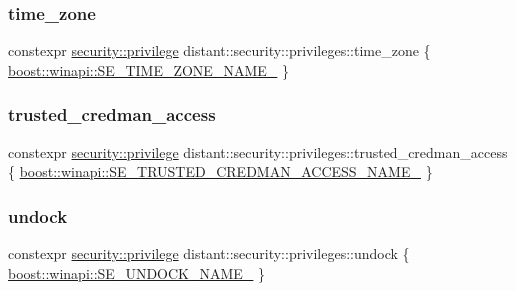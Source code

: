 \mbox{\label{namespacedistant_1_1security_1_1privileges_ab1760e79a82ab6be6b9039420fdfde66}} 
\subsubsection{\texorpdfstring{time\+\_\+zone}{time\_zone}}
{\footnotesize\ttfamily constexpr \mbox{\hyperlink{classdistant_1_1security_1_1privilege}{security\+::privilege}} distant\+::security\+::privileges\+::time\+\_\+zone \{ \mbox{\hyperlink{namespaceboost_1_1winapi_ae247e2a627f5dcd340f927f6cfa50555}{boost\+::winapi\+::\+S\+E\+\_\+\+T\+I\+M\+E\+\_\+\+Z\+O\+N\+E\+\_\+\+N\+A\+M\+E\+\_\+}} \}}

\mbox{\label{namespacedistant_1_1security_1_1privileges_ab3ef76716fb9df03cbf951909d828001}} 
\subsubsection{\texorpdfstring{trusted\+\_\+credman\+\_\+access}{trusted\_credman\_access}}
{\footnotesize\ttfamily constexpr \mbox{\hyperlink{classdistant_1_1security_1_1privilege}{security\+::privilege}} distant\+::security\+::privileges\+::trusted\+\_\+credman\+\_\+access \{ \mbox{\hyperlink{namespaceboost_1_1winapi_a2f5b02608b721efadf8d8dc36ca6ee47}{boost\+::winapi\+::\+S\+E\+\_\+\+T\+R\+U\+S\+T\+E\+D\+\_\+\+C\+R\+E\+D\+M\+A\+N\+\_\+\+A\+C\+C\+E\+S\+S\+\_\+\+N\+A\+M\+E\+\_\+}} \}}

\mbox{\label{namespacedistant_1_1security_1_1privileges_af807a9fb7ffa80bd7f698978f035636c}} 
\subsubsection{\texorpdfstring{undock}{undock}}
{\footnotesize\ttfamily constexpr \mbox{\hyperlink{classdistant_1_1security_1_1privilege}{security\+::privilege}} distant\+::security\+::privileges\+::undock \{ \mbox{\hyperlink{namespaceboost_1_1winapi_a3953665670c8045805c068852e5ca998}{boost\+::winapi\+::\+S\+E\+\_\+\+U\+N\+D\+O\+C\+K\+\_\+\+N\+A\+M\+E\+\_\+}} \}}

